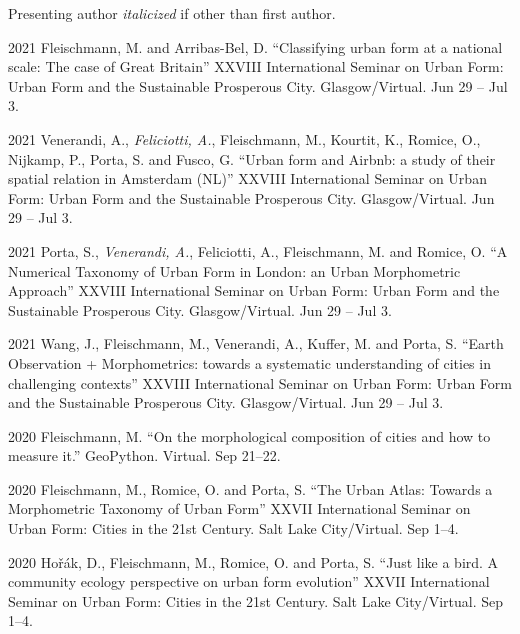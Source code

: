 \documentclass[12pt,a4paper]{report}
\begin{document}
    Presenting author \textit{italicized} if other than first author.\bigskip

    \begin{tablist}

        \item[2021] \tab{}Fleischmann, M. and Arribas-Bel, D. \enquote{Classifying urban form at a national scale: The case of Great Britain} XXVIII International Seminar on Urban Form: Urban Form and the Sustainable Prosperous City. Glasgow/Virtual. \@ Jun 29 -- Jul 3.

        \item[2021] \tab{}Venerandi, A., \textit{Feliciotti, A.}, Fleischmann, M., Kourtit, K., Romice, O., Nijkamp, P., Porta, S. and Fusco, G. \enquote{Urban form and Airbnb: a study of their spatial relation in Amsterdam (NL)} XXVIII International Seminar on Urban Form: Urban Form and the Sustainable Prosperous City. Glasgow/Virtual. \@ Jun 29 -- Jul 3.

        \item[2021] \tab{}Porta, S., \textit{Venerandi, A.}, Feliciotti, A., Fleischmann, M. and Romice, O. \enquote{A Numerical Taxonomy of Urban Form in London: an Urban Morphometric Approach} XXVIII International Seminar on Urban Form: Urban Form and the Sustainable Prosperous City. Glasgow/Virtual. \@ Jun 29 -- Jul 3.

        \item[2021] \tab{}Wang, J., Fleischmann, M., Venerandi, A., Kuffer, M. and Porta, S. \enquote{Earth Observation + Morphometrics: towards a systematic understanding of cities in challenging contexts} XXVIII International Seminar on Urban Form: Urban Form and the Sustainable Prosperous City. Glasgow/Virtual. \@ Jun 29 -- Jul 3.

        \item[2020] \tab{}Fleischmann, M. \enquote{On the morphological composition of cities and how to measure it.} GeoPython. Virtual. \@ Sep 21--22.

        \item[2020] \tab{}Fleischmann, M., Romice, O. and Porta, S. \enquote{The Urban Atlas: Towards a Morphometric Taxonomy of Urban Form} XXVII International Seminar on Urban Form: Cities in the 21st Century. Salt Lake City/Virtual. \@ Sep 1--4.

        \item[2020] \tab{}Hořák, D., Fleischmann, M., Romice, O. and Porta, S. \enquote{Just like a bird. A community ecology perspective on urban form evolution} XXVII International Seminar on Urban Form: Cities in the 21st Century. Salt Lake City/Virtual. \@ Sep 1--4.


\end{tablist}
\end{document}
